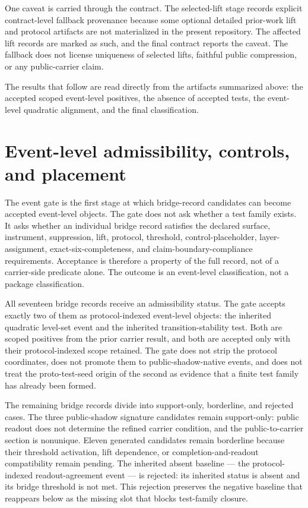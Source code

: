 \documentclass[11pt]{article}
\theoremstyle{definition}
\begin{document}
One caveat is carried through the contract. The selected-lift stage records explicit contract-level fallback provenance because some optional detailed prior-work lift and protocol artifacts are not materialized in the present repository. The affected lift records are marked as such, and the final contract reports the caveat. The fallback does not license uniqueness of selected lifts, faithful public compression, or any public-carrier claim.

The results that follow are read directly from the artifacts summarized above: the accepted scoped event-level positives, the absence of accepted tests, the event-level quadratic alignment, and the final classification.
 \section{Event-level admissibility, controls, and placement}
\label{sec:event-admissibility-controls}

The event gate is the first stage at which bridge-record candidates can become accepted event-level objects. The gate does not ask whether a test family exists. It asks whether an individual bridge record satisfies the declared surface, instrument, suppression, lift, protocol, threshold, control-placeholder, layer-assignment, exact-six-completeness, and claim-boundary-compliance requirements. Acceptance is therefore a property of the full record, not of a carrier-side predicate alone. The outcome is an event-level classification, not a package classification.

All seventeen bridge records receive an admissibility status. The gate accepts exactly two of them as protocol-indexed event-level objects: the inherited quadratic level-set event and the inherited transition-stability test. Both are scoped positives from the prior carrier result, and both are accepted only with their protocol-indexed scope retained. The gate does not strip the protocol coordinates, does not promote them to public-shadow-native events, and does not treat the proto-test-seed origin of the second as evidence that a finite test family has already been formed.

The remaining bridge records divide into support-only, borderline, and rejected cases. The three public-shadow signature candidates remain support-only: public readout does not determine the refined carrier condition, and the public-to-carrier section is nonunique. Eleven generated candidates remain borderline because their threshold activation, lift dependence, or completion-and-readout compatibility remain pending. The inherited absent baseline — the protocol-indexed readout-agreement event — is rejected: its inherited status is absent and its bridge threshold is not met. This rejection preserves the negative baseline that reappears below as the missing slot that blocks test-family closure.
\end{document}
